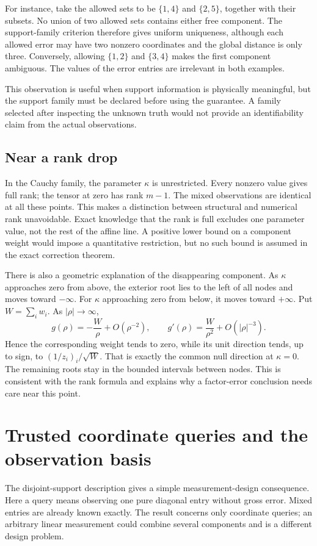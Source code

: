 For instance, take the allowed sets to be $\{1,4\}$ and $\{2,5\}$, together with their subsets. No union of two allowed sets contains either free component. The support-family criterion therefore gives uniform uniqueness, although each allowed error may have two nonzero coordinates and the global distance is only three. Conversely, allowing $\{1,2\}$ and $\{3,4\}$ makes the first component ambiguous. The values of the error entries are irrelevant in both examples.

This observation is useful when support information is physically meaningful, but the support family must be declared before using the guarantee. A family selected after inspecting the unknown truth would not provide an identifiability claim from the actual observations.

\subsection{Near a rank drop}
In the Cauchy family, the parameter $\kappa$ is unrestricted. Every nonzero value gives full rank; the tensor at zero has rank $m-1$. The mixed observations are identical at all these points. This makes a distinction between structural and numerical rank unavoidable. Exact knowledge that the rank is full excludes one parameter value, not the rest of the affine line. A positive lower bound on a component weight would impose a quantitative restriction, but no such bound is assumed in the exact correction theorem.

There is also a geometric explanation of the disappearing component. As $\kappa$ approaches zero from above, the exterior root lies to the left of all nodes and moves toward $-\infty$. For $\kappa$ approaching zero from below, it moves toward $+\infty$. Put $W=\sum_i w_i$. As $|\rho|\to\infty$,
\[
 g(\rho)=-\frac{W}{\rho}+O(\rho^{-2}),\qquad
 g'(\rho)=\frac{W}{\rho^2}+O(|\rho|^{-3}).
\]
Hence the corresponding weight tends to zero, while its unit direction tends, up to sign, to $(1/z_i)_i/\sqrt W$. That is exactly the common null direction at $\kappa=0$. The remaining roots stay in the bounded intervals between nodes. This is consistent with the rank formula and explains why a factor-error conclusion needs care near this point.

\section{Trusted coordinate queries and the observation basis}\label{app:queries}
The disjoint-support description gives a simple measurement-design consequence. Here a query means observing one pure diagonal entry without gross error. Mixed entries are already known exactly. The result concerns only coordinate queries; an arbitrary linear measurement could combine several components and is a different design problem.

